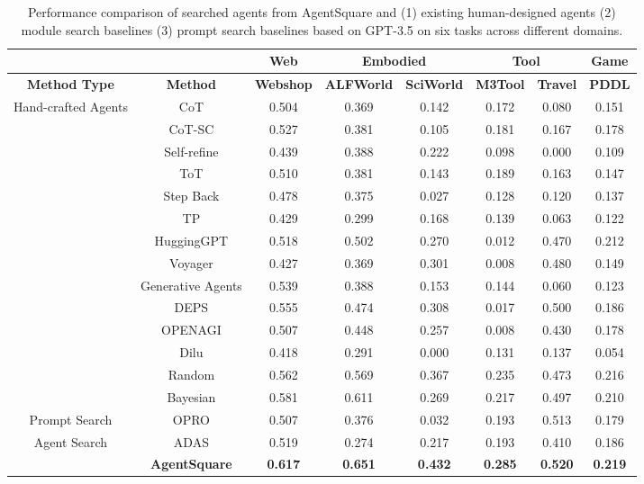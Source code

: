 \setlength{\tabcolsep}{0.5mm} 
\begin{table}[t!]
    \centering
    \begin{tabular}{cccccccc}
    \hline
    & & \textbf{Web} & \multicolumn{2}{c}{\textbf{Embodied}} & \multicolumn{2}{c}{\textbf{Tool}} & \textbf{Game} \\ 
    \hline
    \textbf{Method Type} & \textbf{Method} & \multicolumn{1}{c}{\textbf{Webshop}} & \multicolumn{1}{c}{\textbf{ALFWorld}} & \multicolumn{1}{c}{\textbf{SciWorld}} & \multicolumn{1}{c}{\textbf{M3Tool}} & \multicolumn{1}{c}{\textbf{Travel}} & \multicolumn{1}{c}{\textbf{PDDL}}\\
    \hline
    \multirow{13}{*}{Hand-crafted Agents} 
        & CoT & 0.504 & 0.369 & 0.142 & 0.172 &0.080& 0.151\\ 
        & CoT-SC & 0.527 & 0.381 & 0.105& 0.181  & 0.167& 0.178\\ 
        & Self-refine & 0.439 & 0.388 & 0.222& 0.098  & 0.000& 0.109\\ 
        & ToT & 0.510 & 0.381 & 0.143 & 0.189  & 0.163& 0.147\\ 
        & Step Back & 0.478 & 0.375 &0.027& 0.128  & 0.120& 0.137\\ 
        & TP & 0.429 & 0.299 &0.168& 0.139  & 0.063 & 0.122\\ 
        & HuggingGPT & 0.518 & 0.502 & 0.270& 0.012  &0.470 & 0.212 \\ 
        & Voyager & 0.427 & 0.369 & 0.301& 0.008&0.480 &0.149\\ 
        & Generative Agents & 0.539 & 0.388 & 0.153& 0.144  & 0.060& 0.123 \\ 
        & DEPS & 0.555 & 0.474 & 0.308 & 0.017  & 0.500& 0.186\\ 
        & OPENAGI & 0.507 & 0.448 & 0.257 & 0.008  & 0.430& 0.178\\ 
        & Dilu & 0.418 & 0.291 &0.000& 0.131 &0.137 &0.054\\ 
    \hline
    \multirow{2}{*}{Module Search} 
        & Random  & 0.562 & 0.569 & 0.367& 0.235 & 0.473&0.216 \\
        & Bayesian & 0.581 & 0.611 & 0.269& 0.217 & 0.497&0.210 \\
    \hline
    \multirow{1}{*}{Prompt Search} 
        & OPRO & 0.507 & 0.376 & 0.032& 0.193 & 0.513& 0.179\\
    \hline
    \multirow{1}{*}{Agent Search} 
        & ADAS & 0.519 & 0.274 & 0.217 & 0.193 & 0.410 & 0.186 \\
    \hline
    \multirow{1}{*}{} 
        & \textbf{AgentSquare} & \textbf{0.617} & \textbf{0.651} &\textbf{0.432}& \textbf{0.285}&\textbf{0.520}&\textbf{0.219} \\ 
    \hline
    \end{tabular}
    {\caption{Performance comparison of searched agents from AgentSquare and (1) existing human-designed agents (2) module search baselines (3) prompt search baselines based on GPT-3.5 on six tasks across different domains.}
    \label{tab:tab1}}
\end{table}

